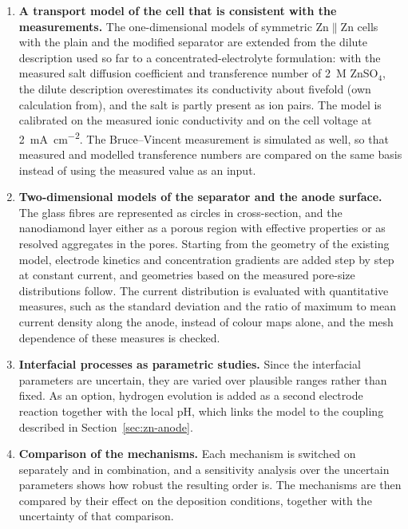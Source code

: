 \begin{enumerate}
  \item \textbf{A transport model of the cell that is consistent with the measurements.}
  The one-dimensional models of symmetric Zn$\|$Zn cells with the plain and the modified separator are extended from the dilute description used so far to a concentrated-electrolyte formulation: with the measured salt diffusion coefficient and transference number of \SI{2}{M} ZnSO$_4$, the dilute description overestimates its conductivity about fivefold (own calculation from\cite{albright_mutual_1975,purser_transference_1951,bester-rogac_electrical_2008}), and the salt is partly present as ion pairs\cite{buchner_ion_2023}.
  The model is calibrated on the measured ionic conductivity and on the cell voltage at \SI{2}{mA.cm^{-2}}.
  The Bruce--Vincent measurement is simulated as well, so that measured and modelled transference numbers are compared on the same basis instead of using the measured value as an input.
  \item \textbf{Two-dimensional models of the separator and the anode surface.}
  The glass fibres are represented as circles in cross-section, and the nanodiamond layer either as a porous region with effective properties or as resolved aggregates in the pores.
  Starting from the geometry of the existing model, electrode kinetics and concentration gradients are added step by step at constant current, and geometries based on the measured pore-size distributions follow.
  The current distribution is evaluated with quantitative measures, such as the standard deviation and the ratio of maximum to mean current density along the anode, instead of colour maps alone, and the mesh dependence of these measures is checked.
  \item \textbf{Interfacial processes as parametric studies.}
  Since the interfacial parameters are uncertain, they are varied over plausible ranges rather than fixed.
  As an option, hydrogen evolution is added as a second electrode reaction together with the local pH, which links the model to the coupling described in Section~\ref{sec:zn-anode}.
  \item \textbf{Comparison of the mechanisms.}
  Each mechanism is switched on separately and in combination, and a sensitivity analysis over the uncertain parameters shows how robust the resulting order is.
  The mechanisms are then compared by their effect on the deposition conditions, together with the uncertainty of that comparison.
\end{enumerate}

